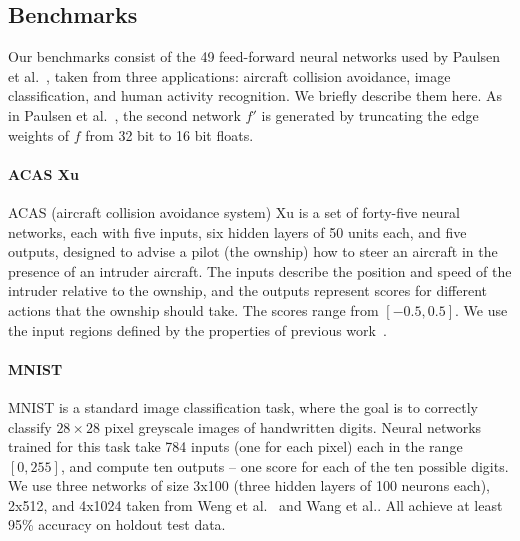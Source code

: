 

\subsection{Benchmarks}

Our benchmarks consist of the 49 feed-forward neural networks used by
Paulsen et al.~\cite{PaulsenWW20}, taken from three applications:
aircraft collision avoidance, image classification, and human activity
recognition. We briefly describe them here. As in Paulsen et al.~\cite{PaulsenWW20}, the second
network $ f' $ is generated by truncating the edge weights of $f$ from
32 bit to 16 bit floats.

\paragraph{ACAS Xu~\cite{JulianKO18}}
ACAS (aircraft collision avoidance system) Xu is a set of
forty-five neural networks, each with five inputs, six hidden layers of 50 units each, and five outputs,
designed to advise a pilot (the ownship) how to steer an aircraft in the presence of an intruder aircraft.
The inputs describe the position and speed of the intruder relative to the ownship, and the
outputs represent scores for different actions that the ownship should take.
The scores range from $ [-0.5, 0.5] $. We use the input regions defined by the properties of previous
work~\cite{KatzBDJK17, WangPWYJ18}.

\paragraph{MNIST~\cite{LecunBBH98}}
MNIST is a standard image classification task, where the goal is to
correctly classify $ 28 \times 28 $ pixel greyscale images of handwritten
digits. Neural networks trained for this task take 784 inputs (one for
each pixel) each in the range $ [0,255] $, and compute ten outputs -- one
score for each of the ten possible digits. We use three networks of size
3x100 (three hidden layers of 100 neurons each), 2x512, and 4x1024 taken from Weng et al.~\cite{WengZCSHDBD18} and
Wang et al.\cite{WangPWYJ18nips}. All achieve at least 95\% accuracy on
holdout test data.

